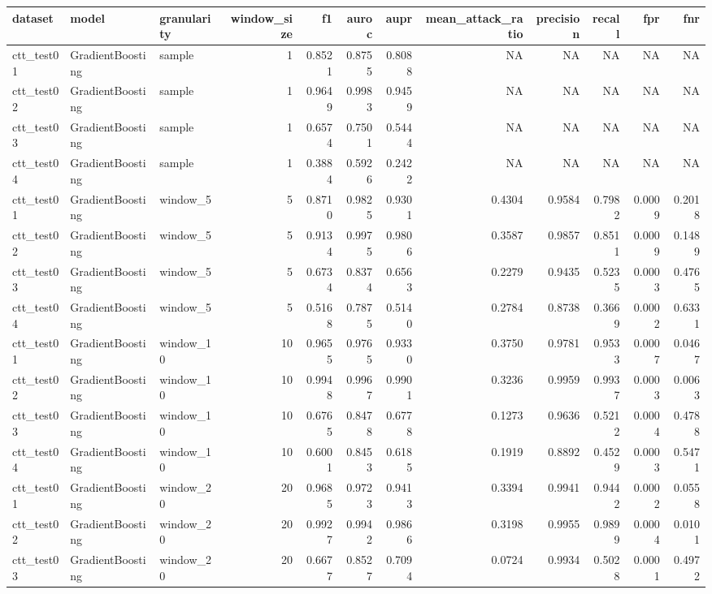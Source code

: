 \begin{tabular}{lllrrrrrrrrr}
\toprule
dataset & model & granularity & window\_size & f1 & auroc & aupr & mean\_attack\_ratio & precision & recall & fpr & fnr \\
\midrule
ctt\_test01 & GradientBoosting & sample & 1 & 0.8521 & 0.8755 & 0.8088 & NA & NA & NA & NA & NA \\
ctt\_test02 & GradientBoosting & sample & 1 & 0.9649 & 0.9983 & 0.9459 & NA & NA & NA & NA & NA \\
ctt\_test03 & GradientBoosting & sample & 1 & 0.6574 & 0.7501 & 0.5444 & NA & NA & NA & NA & NA \\
ctt\_test04 & GradientBoosting & sample & 1 & 0.3884 & 0.5926 & 0.2422 & NA & NA & NA & NA & NA \\
ctt\_test01 & GradientBoosting & window\_5 & 5 & 0.8710 & 0.9825 & 0.9301 & 0.4304 & 0.9584 & 0.7982 & 0.0009 & 0.2018 \\
ctt\_test02 & GradientBoosting & window\_5 & 5 & 0.9134 & 0.9975 & 0.9806 & 0.3587 & 0.9857 & 0.8511 & 0.0009 & 0.1489 \\
ctt\_test03 & GradientBoosting & window\_5 & 5 & 0.6734 & 0.8374 & 0.6563 & 0.2279 & 0.9435 & 0.5235 & 0.0003 & 0.4765 \\
ctt\_test04 & GradientBoosting & window\_5 & 5 & 0.5168 & 0.7875 & 0.5140 & 0.2784 & 0.8738 & 0.3669 & 0.0002 & 0.6331 \\
ctt\_test01 & GradientBoosting & window\_10 & 10 & 0.9655 & 0.9765 & 0.9330 & 0.3750 & 0.9781 & 0.9533 & 0.0007 & 0.0467 \\
ctt\_test02 & GradientBoosting & window\_10 & 10 & 0.9948 & 0.9967 & 0.9901 & 0.3236 & 0.9959 & 0.9937 & 0.0003 & 0.0063 \\
ctt\_test03 & GradientBoosting & window\_10 & 10 & 0.6765 & 0.8478 & 0.6778 & 0.1273 & 0.9636 & 0.5212 & 0.0004 & 0.4788 \\
ctt\_test04 & GradientBoosting & window\_10 & 10 & 0.6001 & 0.8453 & 0.6185 & 0.1919 & 0.8892 & 0.4529 & 0.0003 & 0.5471 \\
ctt\_test01 & GradientBoosting & window\_20 & 20 & 0.9685 & 0.9723 & 0.9413 & 0.3394 & 0.9941 & 0.9442 & 0.0002 & 0.0558 \\
ctt\_test02 & GradientBoosting & window\_20 & 20 & 0.9927 & 0.9942 & 0.9866 & 0.3198 & 0.9955 & 0.9899 & 0.0004 & 0.0101 \\
ctt\_test03 & GradientBoosting & window\_20 & 20 & 0.6677 & 0.8527 & 0.7094 & 0.0724 & 0.9934 & 0.5028 & 0.0001 & 0.4972 \\

\end{tabular}
